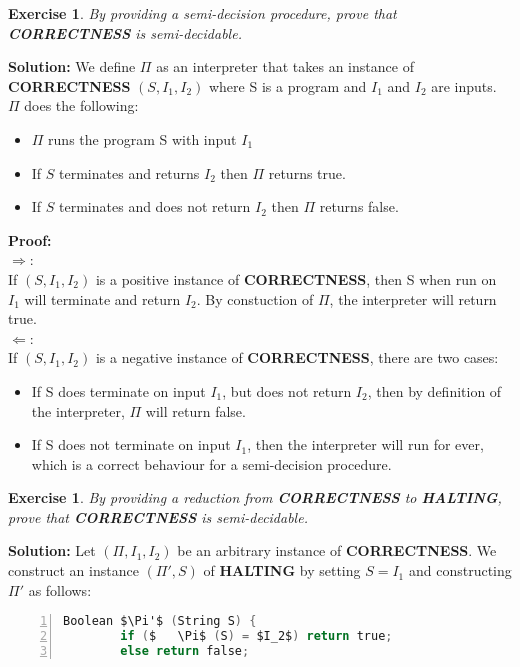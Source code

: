 \documentclass [10pt]{article}
\newtheorem{exercise}[theorem]{Exercise}
\begin{document}
\begin{exercise}
    By providing a semi-decision procedure, prove that \textbf{CORRECTNESS} is
    semi-decidable.
\end{exercise}

\medskip

\textbf{Solution:}
We define $\Pi$ as an interpreter that takes an instance of \textbf{CORRECTNESS} $(S, I_1, I_2)$ where S is a program and $I_1$ and $I_2$ are inputs. $\Pi$ does the following:
\begin{itemize}
 \item $\Pi$ runs the program S with input $I_1$
 \item If $S$ terminates and returns $I_2$ then $\Pi$ returns true.
 \item If $S$ terminates and does not return $I_2$ then $\Pi$ returns false.
\end{itemize}

\textbf{Proof:}\\
$\Rightarrow$:\\
If $(S, I_1, I_2)$ is a positive instance of \textbf{CORRECTNESS}, then S when run on $I_1$ will terminate and return $I_2$. By constuction of $\Pi$, the interpreter will return true.\\
$\Leftarrow$:\\
If $(S, I_1, I_2)$ is a negative instance of \textbf{CORRECTNESS}, there are two cases:
\begin{itemize}
 \item If S does terminate on input $I_1$, but does not return $I_2$, then by definition of the interpreter, $\Pi$ will return false.
 \item If S does not terminate on input $I_1$, then the interpreter will run for ever, which is a correct behaviour for a semi-decision procedure.
\end{itemize}


\begin{exercise}
    By providing a reduction from \textbf{CORRECTNESS} to \textbf{HALTING},
    prove that \textbf{CORRECTNESS} is semi-decidable.
\end{exercise}

\medskip

\textbf{Solution:}
Let $(\Pi, I_1, I_2)$ be an arbitrary instance of \textbf{CORRECTNESS}. We construct an instance $(\Pi', S)$ of \textbf{HALTING} by setting $S=I_1$ and constructing $\Pi'$ as follows:
\begin{lstlisting}[mathescape, language=C, numbers=left, basicstyle=\ttfamily, backgroundcolor=\color{lightlightgray},]
    Boolean $\Pi'$ (String S) {
        if ($	\Pi$ (S) = $I_2$) return true;
        else return false;
\end{lstlisting}
\end{document}
